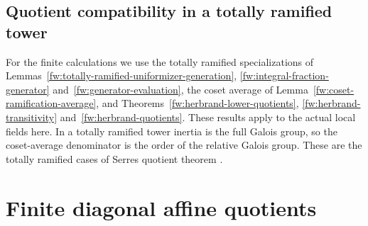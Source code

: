 \subsection{Quotient compatibility in a totally ramified tower}

For the finite calculations we use the totally ramified specializations of
Lemmas~\ref{fw:totally-ramified-uniformizer-generation},
\ref{fw:integral-fraction-generator} and~\ref{fw:generator-evaluation},
the coset average of Lemma~\ref{fw:coset-ramification-average}, and
Theorems~\ref{fw:herbrand-lower-quotients},
\ref{fw:herbrand-transitivity} and~\ref{fw:herbrand-quotients}.
These results apply to the actual local fields here. In a totally ramified
tower inertia is the full Galois group, so the coset-average denominator is
the order of the relative Galois group. These are the totally ramified
cases of Serre\textquotesingle s quotient theorem
\cite[Chapter IV, Sections 1 and 3]{Serre1979}.

\section{Finite diagonal affine quotients}

